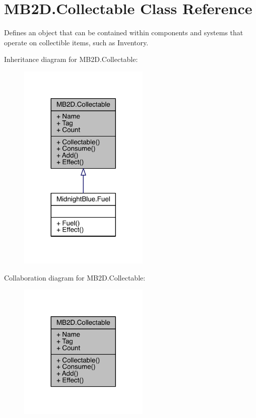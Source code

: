 \hypertarget{class_m_b2_d_1_1_collectable}{}\section{M\+B2\+D.\+Collectable Class Reference}
\label{class_m_b2_d_1_1_collectable}


Defines an object that can be contained within components and systems that operate on collectible items, such as Inventory.  




Inheritance diagram for M\+B2\+D.\+Collectable\+:\nopagebreak
\begin{figure}[H]
\begin{center}
\leavevmode
\includegraphics[width=176pt]{class_m_b2_d_1_1_collectable__inherit__graph}
\end{center}
\end{figure}


Collaboration diagram for M\+B2\+D.\+Collectable\+:\nopagebreak
\begin{figure}[H]
\begin{center}
\leavevmode
\includegraphics[width=176pt]{class_m_b2_d_1_1_collectable__coll__graph}
\end{center}
\end{figure}

